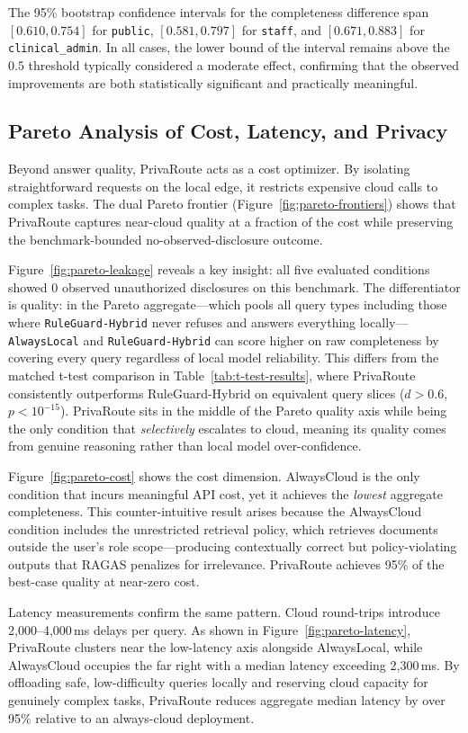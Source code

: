 \documentclass{article}
\newcommand{\code}[1]{{\small\texttt{#1}}}
\begin{document}
The 95\% bootstrap confidence intervals for the completeness difference span $[0.610, 0.754]$ for \code{public}, $[0.581, 0.797]$ for \code{staff}, and $[0.671, 0.883]$ for \code{clinical\_admin}. In all cases, the lower bound of the interval remains above the $0.5$ threshold typically considered a moderate effect, confirming that the observed improvements are both statistically significant and practically meaningful.

\subsection{Pareto Analysis of Cost, Latency, and Privacy}
Beyond answer quality, PrivaRoute acts as a cost optimizer. By isolating straightforward requests on the local edge, it restricts expensive cloud calls to complex tasks. The dual Pareto frontier (Figure~\ref{fig:pareto-frontiers}) shows that PrivaRoute captures near-cloud quality at a fraction of the cost while preserving the benchmark-bounded no-observed-disclosure outcome.

Figure~\ref{fig:pareto-leakage} reveals a key insight: all five evaluated conditions showed 0 observed unauthorized disclosures on this benchmark. The differentiator is quality: in the Pareto aggregate---which pools all query types including those where \code{RuleGuard-Hybrid} never refuses and answers everything locally---\code{AlwaysLocal} and \code{RuleGuard-Hybrid} can score higher on raw completeness by covering every query regardless of local model reliability. This differs from the matched t-test comparison in Table~\ref{tab:t-test-results}, where PrivaRoute consistently outperforms RuleGuard-Hybrid on equivalent query slices ($d > 0.6$, $p < 10^{-15}$). PrivaRoute sits in the middle of the Pareto quality axis while being the only condition that \textit{selectively} escalates to cloud, meaning its quality comes from genuine reasoning rather than local model over-confidence.

Figure~\ref{fig:pareto-cost} shows the cost dimension. AlwaysCloud is the only condition that incurs meaningful API cost, yet it achieves the \textit{lowest} aggregate completeness. This counter-intuitive result arises because the AlwaysCloud condition includes the unrestricted retrieval policy, which retrieves documents outside the user's role scope---producing contextually correct but policy-violating outputs that RAGAS penalizes for irrelevance. PrivaRoute achieves 95\% of the best-case quality at near-zero cost.

Latency measurements confirm the same pattern. Cloud round-trips introduce 2,000--4,000\,ms delays per query. As shown in Figure~\ref{fig:pareto-latency}, PrivaRoute clusters near the low-latency axis alongside AlwaysLocal, while AlwaysCloud occupies the far right with a median latency exceeding 2,300\,ms. By offloading safe, low-difficulty queries locally and reserving cloud capacity for genuinely complex tasks, PrivaRoute reduces aggregate median latency by over 95\% relative to an always-cloud deployment.
\end{document}

